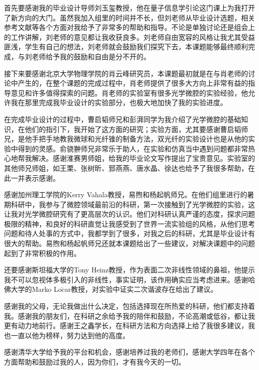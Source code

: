 \begin{acknowledgement}
首先要感谢我的毕业设计导师刘玉玺教授，他在量子信息学引论这门课上为我打开了新方向的大门。虽然我加入组里的时间并不长，但刘老师从毕业设计选题，相关参考文献等各个方面对我给予了非常多的帮助和指导。不论是单独讨论还是组会上的工作讲解，刘老师的意见都让我收获良多。刘老师自由宽容的风格让我尤其受益匪浅，学生有自己的想法，刘老师就会鼓励我们探究下去，本课题能够最终顺利完成，与刘老师给予我的鼓励和自由是分不开的。

接下来要感谢北京大学物理学院的肖云峰研究员，本课题最初就是在与肖老师的讨论中产生的，在整个课题的完成过程中，肖老师提供了很多大方向上非常有益的指导意见和许多值得探索的问题。肖老师的实验室有很多光学微腔的实验经验，他允许我在那里完成我毕业设计的实验部分，也极大地加快了我的实验进度。

在完成毕业设计的过程中，曹启韬师兄和彭湃同学为我介绍了光学微腔的基础知识，在他们的指引下，我开始了这方面的研究；实验方面，尤其要感谢曹启韬师兄，是他手把手地教我微球和光纤锥的制备方法，双光纤的实验设计也是从他的实验中得到的灵感。俞骁翀师兄非常乐于助人，在实验和仿真当中遇到问题都非常热心地帮我解决。感谢淮赛男师姐，给我的毕业论文写作提出了宝贵意见。实验室的其他师兄师姐，如王栗、张树昕、郅燕燕、唐水晶、徐达也给予了我很多帮助，在此一并表示感谢。

感谢加州理工学院的Kerry Vahala教授，易煦和杨起帆师兄。在他们组里进行的暑期科研中，我参与了微腔领域最前沿的科研，第一次接触到了光学微腔的实验，这让我对光学微腔研究有了更高层次的认识。他们对科研认真严谨的态度，探求问题极限的精神，和良好的科研直觉让我感受到了世界一流实验组的风格，从他们思考问题和待人处事的方式中，我都学到了很多，对我之后的科研，尤其是毕业设计有很大的帮助。易煦和杨起帆师兄还就本课题给出了一些建议，对解决课题中的问题起到了非常积极的作用。

还要感谢斯坦福大学的Tony Heinz教授，作为表面二次非线性领域的鼻祖，他提示我不可以忽视体多极引入的非线性，事实证明，该作用确实应当考虑进来。感谢哈佛大学的Marko Lo$\mathrm{\check{c}}$ar教授，对实验中证实二次谐波存在给出了建议。

感谢我的父母，无论我做出什么决定，包括选择现在所热爱的科研，他们都支持着我。感谢我的朋友们，在科研之余给予我的陪伴和鼓励，不论高潮或低谷，都让我更有动力地前行。感谢王之鑫学长，在科研方法和方向选择上给了我很多建议，我也一直以他为榜样，努力达到他的高度。

感谢清华大学给予我的平台和机会，感谢培养过我的老师们，感谢大学四年在各个方面帮助和鼓励过我的人，因为你们，才有我今天的一切。
\end{acknowledgement}
